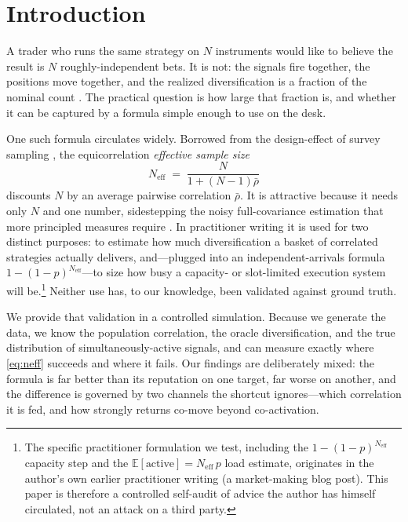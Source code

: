 \documentclass[11pt]{article}
\newcommand{\Neff}{N_{\mathrm{eff}}}
\newcommand{\rbar}{\bar{\rho}}
\begin{document}
\section{Introduction}

A trader who runs the same strategy on $N$ instruments would like to believe the
result is $N$ roughly-independent bets. It is not: the signals fire together, the
positions move together, and the realized diversification is a fraction of the
nominal count \citep{markowitz1952portfolio,grinold1989fundamental}. The
practical question is how large that fraction is, and whether it can be captured
by a formula simple enough to use on the desk.

One such formula circulates widely. Borrowed from the design-effect of survey
sampling \citep{kish1965survey}, the equicorrelation \emph{effective sample size}
\begin{equation}
\Neff \;=\; \frac{N}{1+(N-1)\rbar}
\label{eq:neff}
\end{equation}
discounts $N$ by an average pairwise correlation $\rbar$. It is attractive because
it needs only $N$ and one number, sidestepping the noisy full-covariance
estimation that more principled measures require
\citep{laloux1999noise,ledoit2004honey}. In practitioner writing it is used for
two distinct purposes: to estimate how much diversification a basket of
correlated strategies actually delivers, and---plugged into an
independent-arrivals formula $1-(1-p)^{\Neff}$---to size how busy a capacity- or
slot-limited execution system will be.\footnote{The specific practitioner
formulation we test, including the $1-(1-p)^{\Neff}$ capacity step and the
$\mathbb{E}[\text{active}]=\Neff\,p$ load estimate, originates in the author's
own earlier practitioner writing (a market-making blog post). This paper is
therefore a controlled self-audit of advice the author has himself circulated,
not an attack on a third party.} Neither use has, to our knowledge, been
validated against ground truth.

We provide that validation in a controlled simulation. Because we generate the
data, we know the population correlation, the oracle diversification, and the true
distribution of simultaneously-active signals, and can measure exactly where
\eqref{eq:neff} succeeds and where it fails. Our findings are deliberately
mixed: the formula is far better than its reputation on one target, far worse on
another, and the difference is governed by two channels the shortcut
ignores---which correlation it is fed, and how strongly returns co-move beyond
co-activation.
\end{document}
